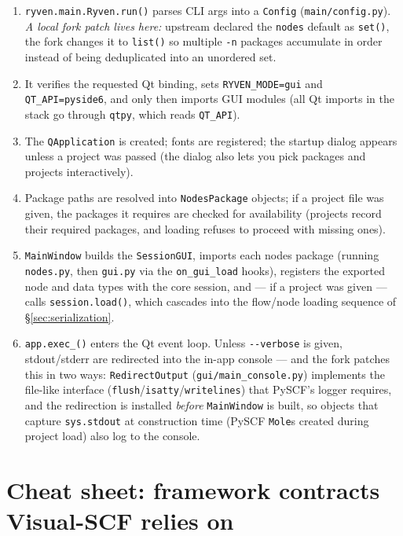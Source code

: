 \documentclass[10pt,a4paper]{article}
\newcommand{\code}[1]{\texttt{\small #1}}
\begin{document}
\begin{enumerate}[itemsep=1pt]
\item \code{ryven.main.Ryven.run()} parses CLI args into a \code{Config}
      (\code{main/config.py}).
      \emph{A local fork patch lives here:} upstream declared the
      \code{nodes} default as \code{set()}, the fork changes it to \code{list()} so
      multiple \code{-n} packages accumulate in order instead of being deduplicated
      into an unordered set.
\item It verifies the requested Qt binding, sets
      \code{RYVEN\_MODE=gui} and \code{QT\_API=pyside6}, and only then imports GUI
      modules (all Qt imports in the stack go through \code{qtpy}, which reads
      \code{QT\_API}).
\item The \code{QApplication} is created; fonts are registered; the startup dialog
      appears unless a project was passed (the dialog also lets you pick packages and
      projects interactively).
\item Package paths are resolved into \code{NodesPackage} objects; if a project file
      was given, the packages it requires are checked for availability
      (projects record their required packages, and loading refuses to proceed with
      missing ones).
\item \code{MainWindow} builds the \code{SessionGUI}, imports each nodes package
      (running \code{nodes.py}, then \code{gui.py} via the \code{on\_gui\_load}
      hooks), registers the exported node and data types with the core session, and
      --- if a project was given --- calls \code{session.load()}, which cascades into
      the flow/node loading sequence of \S\ref{sec:serialization}.
\item \code{app.exec\_()} enters the Qt event loop. Unless \code{-{}-verbose} is
      given, stdout/stderr are redirected into the in-app console --- and the fork
      patches this in two ways: \code{RedirectOutput}
      (\code{gui/main\_console.py}) implements the file-like interface
      (\code{flush}/\code{isatty}/\code{writelines}) that PySCF's logger requires,
      and the redirection is installed \emph{before} \code{MainWindow} is built, so
      objects that capture \code{sys.stdout} at construction time (PySCF
      \code{Mole}s created during project load) also log to the console.
\end{enumerate}

\section{Cheat sheet: framework contracts Visual-SCF relies on}
\end{document}
